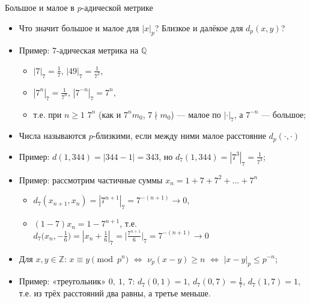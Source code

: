 \documentclass[serif, aspectratio=169]{beamer}
\begin{document}
\begin{frame}{Большое и малое в $p$-адической метрике}
    \begin{itemize}
        \item Что значит большое и малое для $|x|_p$? Близкое и далёкое для $d_p(x,y)$?
        \item Пример: $7$-адическая метрика на $\mathbb{Q}$
        \begin{itemize}
            \item $|7|_7=\frac{1}{7}$, $|49|_7=\frac{1}{7^2}$,
            \item $|7^n|_7=\frac{1}{7^n}$, $|7^{-n}|_7=7^n$,
            \item т.е. при $n\geqslant 1$ $7^n$ (как и $7^nm_0$, $7\nmid m_0$)  --- малое по $|\cdot|_7$, а $7^{-n}$ --- большое;
        \end{itemize}
        \item Числа называются $p$-близкими, если между ними малое расстояние $d_p(\cdot,\cdot)$
        \item Пример: $d(1,344)=|344-1|=343$, но $d_7(1,344)=|7^3|_7=\frac{1}{7^3}$;
        \item Пример: рассмотрим частичные суммы $x_n=1+7+7^2+\dots+7^n$
        \begin{itemize}
            \item $d_7(x_{n+1},x_n)=|7^{n+1}|_7=7^{-(n+1)}\to 0$,
            \item $(1-7)x_n=1-7^{n+1}$, т.е. $d_7\bigl(x_n,-\tfrac16\bigr)=|x_n+\tfrac16|_7=\bigl|\tfrac{7^{n+1}}{6}\bigr|_7=7^{-(n+1)}\to 0$
        \end{itemize}
        \item Для $x,y\in\mathbb{Z}$: 
        $x\equiv y \pmod{p^n}$ $\Leftrightarrow$ $\nu_p(x-y)\geqslant n$ $\Leftrightarrow$ $|x-y|_p\leqslant p^{-n}$;
        \item Пример: «треугольник» $0,\ 1,\ 7$: $d_7(0,1)=1$, $d_7(0,7)=\frac17$, $d_7(1,7)=1$,\\ т.е. из трёх расстояний два равны, а третье меньше.
    \end{itemize}
    
\end{frame}
\end{document}
